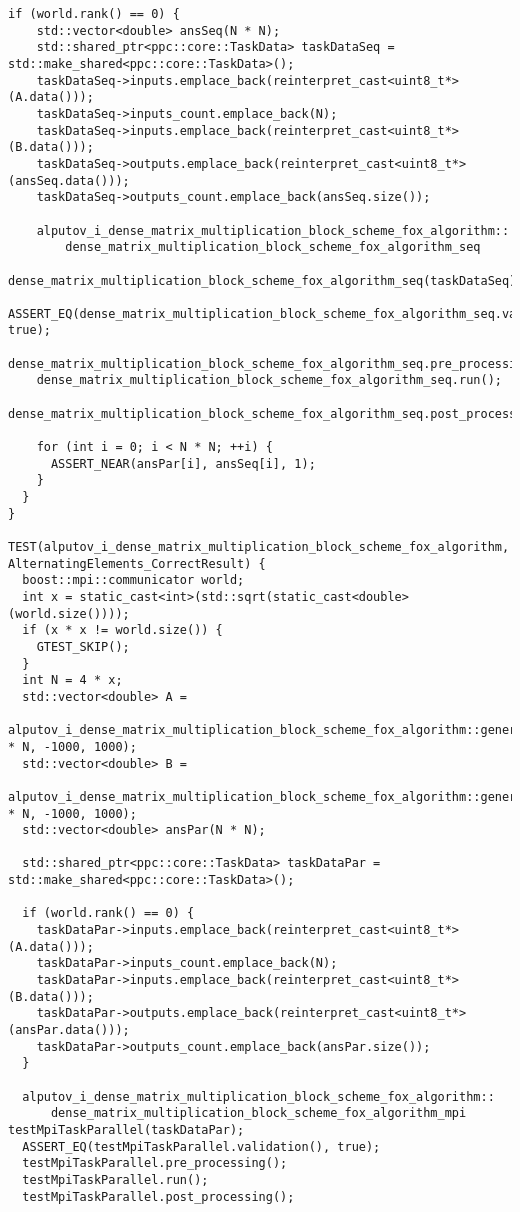 \documentclass{report}
\begin{document}
\begin{lstlisting}[caption={main.cpp(func tests)},label=lst:opsmpi2]
  if (world.rank() == 0) {
    std::vector<double> ansSeq(N * N);
    std::shared_ptr<ppc::core::TaskData> taskDataSeq = std::make_shared<ppc::core::TaskData>();
    taskDataSeq->inputs.emplace_back(reinterpret_cast<uint8_t*>(A.data()));
    taskDataSeq->inputs_count.emplace_back(N);
    taskDataSeq->inputs.emplace_back(reinterpret_cast<uint8_t*>(B.data()));
    taskDataSeq->outputs.emplace_back(reinterpret_cast<uint8_t*>(ansSeq.data()));
    taskDataSeq->outputs_count.emplace_back(ansSeq.size());

    alputov_i_dense_matrix_multiplication_block_scheme_fox_algorithm::
        dense_matrix_multiplication_block_scheme_fox_algorithm_seq
            dense_matrix_multiplication_block_scheme_fox_algorithm_seq(taskDataSeq);
    ASSERT_EQ(dense_matrix_multiplication_block_scheme_fox_algorithm_seq.validation(), true);
    dense_matrix_multiplication_block_scheme_fox_algorithm_seq.pre_processing();
    dense_matrix_multiplication_block_scheme_fox_algorithm_seq.run();
    dense_matrix_multiplication_block_scheme_fox_algorithm_seq.post_processing();

    for (int i = 0; i < N * N; ++i) {
      ASSERT_NEAR(ansPar[i], ansSeq[i], 1);
    }
  }
}

TEST(alputov_i_dense_matrix_multiplication_block_scheme_fox_algorithm, AlternatingElements_CorrectResult) {
  boost::mpi::communicator world;
  int x = static_cast<int>(std::sqrt(static_cast<double>(world.size())));
  if (x * x != world.size()) {
    GTEST_SKIP();
  }
  int N = 4 * x;
  std::vector<double> A =
      alputov_i_dense_matrix_multiplication_block_scheme_fox_algorithm::generator(N * N, -1000, 1000);
  std::vector<double> B =
      alputov_i_dense_matrix_multiplication_block_scheme_fox_algorithm::generator(N * N, -1000, 1000);
  std::vector<double> ansPar(N * N);

  std::shared_ptr<ppc::core::TaskData> taskDataPar = std::make_shared<ppc::core::TaskData>();

  if (world.rank() == 0) {
    taskDataPar->inputs.emplace_back(reinterpret_cast<uint8_t*>(A.data()));
    taskDataPar->inputs_count.emplace_back(N);
    taskDataPar->inputs.emplace_back(reinterpret_cast<uint8_t*>(B.data()));
    taskDataPar->outputs.emplace_back(reinterpret_cast<uint8_t*>(ansPar.data()));
    taskDataPar->outputs_count.emplace_back(ansPar.size());
  }

  alputov_i_dense_matrix_multiplication_block_scheme_fox_algorithm::
      dense_matrix_multiplication_block_scheme_fox_algorithm_mpi testMpiTaskParallel(taskDataPar);
  ASSERT_EQ(testMpiTaskParallel.validation(), true);
  testMpiTaskParallel.pre_processing();
  testMpiTaskParallel.run();
  testMpiTaskParallel.post_processing();


\end{lstlisting}
\end{document}
